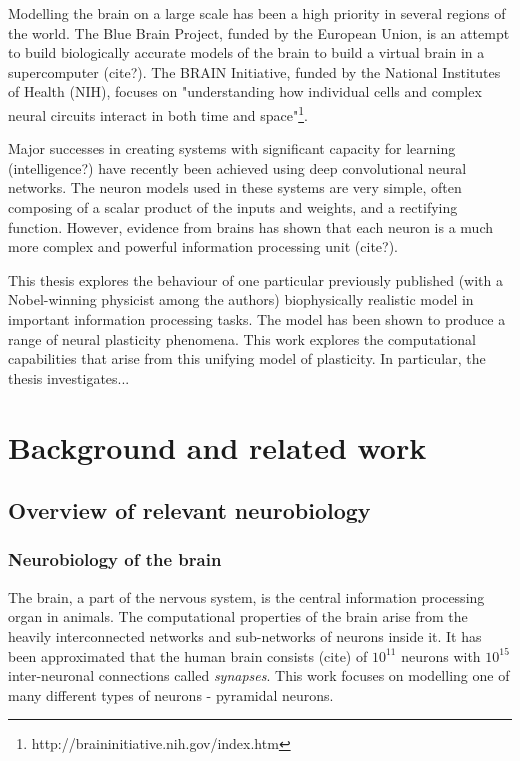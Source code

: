 \documentclass[a4paper,12pt]{report}
\theoremstyle{definition}
\begin{document}
Modelling the brain on a large scale has been a high priority in several regions of the world. The Blue Brain Project, funded by the European Union, is an attempt to build biologically accurate models of the brain to build a virtual brain in a supercomputer (cite?). The BRAIN Initiative, funded by the National Institutes of Health (NIH), focuses on "understanding how individual cells and complex neural circuits interact in both time and space"\footnote{http://braininitiative.nih.gov/index.htm}.

Major successes in creating systems with significant capacity for learning (intelligence?) have recently been achieved using deep convolutional neural networks. The neuron models used in these systems are very simple, often composing of a scalar product of the inputs and weights, and a rectifying function. However, evidence from brains has shown that each neuron is a much more complex and powerful information processing unit (cite?).

This thesis explores the behaviour of one particular previously published (with a Nobel-winning physicist among the authors) biophysically realistic model in important information processing tasks. The model has been shown to produce a range of neural plasticity phenomena. This work explores the computational capabilities that arise from this unifying model of plasticity. In particular, the thesis investigates...



\chapter{Background and related work}


\section{Overview of relevant neurobiology}

\subsection{Neurobiology of the brain}
The brain, a part of the nervous system, is the central information processing organ in animals. The computational properties of the brain arise from the heavily interconnected networks and sub-networks of neurons inside it. It has been approximated that the human brain consists (cite) of $10^{11}$ neurons with $10^{15}$ inter-neuronal connections called \emph{synapses}. This work focuses on modelling one of many different types of neurons - pyramidal neurons.
\end{document}

